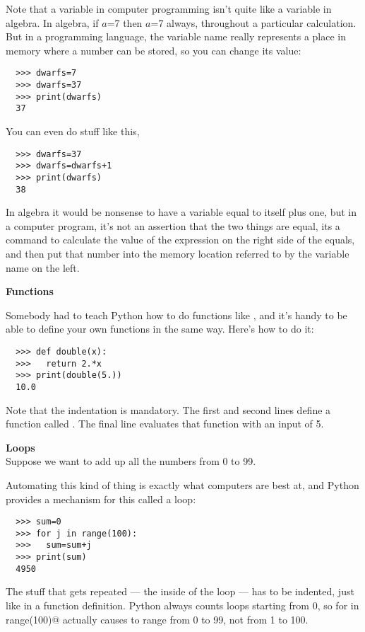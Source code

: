 Note that a variable in computer programming isn't quite like a variable
in algebra. In algebra, if $a$=7 then $a$=7 always, throughout a particular
calculation. But in a programming language, the variable name really
represents a place in memory where a number can be stored, so you can
change its value:

\begin{verbatim}
  >>> dwarfs=7
  >>> dwarfs=37
  >>> print(dwarfs)
  37
\end{verbatim}

\noindent{}You can even do stuff like this,

\begin{verbatim}
  >>> dwarfs=37
  >>> dwarfs=dwarfs+1
  >>> print(dwarfs)
  38
\end{verbatim}

\noindent{}In algebra it would be nonsense to have a variable equal to itself plus
one, but in a computer program, it's not an assertion that the two
things are equal, its a command to calculate the value of the expression
on the right side of the equals, and then put that number into the
memory location referred to by the variable name on the left.


\noindent\textbf{Functions}

Somebody had to teach Python how to do functions like \verb@sqrt@, and it's
handy to be able to define your own functions in the same way.
Here's how to do it:

\begin{verbatim}
  >>> def double(x):
  >>>   return 2.*x
  >>> print(double(5.))
  10.0
\end{verbatim}

\noindent{}Note that the indentation is mandatory. The first and second lines
define a function called \verb@double@. The final line evaluates that function
with an input of 5.

\noindent\textbf{Loops}\\
Suppose we want to add up all the numbers from 0 to 99.

Automating this kind of thing is exactly what computers are best at, and
Python provides a mechanism for this called a loop:

\begin{verbatim}
  >>> sum=0
  >>> for j in range(100):
  >>>   sum=sum+j
  >>> print(sum)
  4950
\end{verbatim}

\noindent{}The stuff that gets repeated --- the inside of the loop --- has to be
indented, just like in a function definition. Python always counts loops
starting from 0, so for \verb@j in range(100)@ actually causes \verb@j@
to range from 0 to 99, not from 1 to 100.
